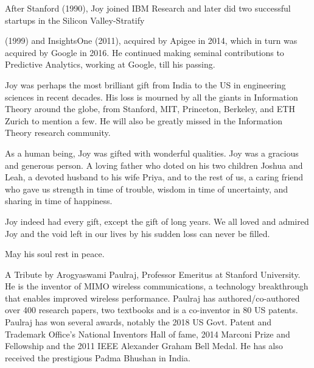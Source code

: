 \begin{multicols}{2}
\vspace{-.1cm}

After Stanford (1990), Joy joined IBM Research and later did two successful startups in the Silicon Valley-Stratify 

\noindent
(1999) and InsightsOne (2011), acquired by Apigee in 2014, which in turn was acquired by Google in 2016. He continued making seminal contributions to Predictive Analytics, working at Google, till his passing.


Joy was perhaps the most brilliant gift from India to the US in engineering sciences in recent decades. His loss is mourned by all the giants in Information Theory around the globe, from Stanford, MIT, Princeton, Berkeley, and ETH Zurich to mention a few. He will also be greatly missed in the Information Theory research community.


As a human being, Joy was gifted with wonderful qualities. Joy was a gracious and generous person. A loving father who doted on his two children Joshua and Leah, a devoted husband to his wife Priya, and to the rest of us,  a caring friend who gave us strength in time of trouble, wisdom in time of uncertainty, and sharing in time of happiness. 


Joy indeed had every gift, except the gift of long years. We all loved and admired Joy and the void left in our lives by his sudden loss can never be filled.

May his soul rest in peace.

A Tribute by Arogyaswami Paulraj, Professor Emeritus at Stanford University. He is the inventor of MIMO wireless communications, a technology breakthrough that enables improved wireless performance. Paulraj has authored/co-authored over 400 research papers, two textbooks and is a co-inventor in 80 US patents. Paulraj has won several awards, notably the 2018 US Govt. Patent and Trademark Office’s National Inventors Hall of fame, 2014 Marconi Prize and Fellowship and the 2011 IEEE Alexander Graham Bell Medal. He has also received the prestigious Padma Bhushan in India. 

\end{multicols}


